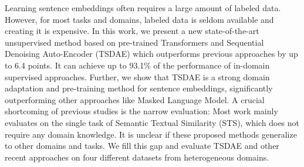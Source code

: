 Learning sentence embeddings often requires a large amount of labeled data. However, for most tasks and domains, labeled data is seldom available and creating it is expensive. In this work, we present a new state-of-the-art unsupervised method based on pre-trained Transformers and Sequential Denoising Auto-Encoder (TSDAE) which outperforms previous approaches by up to 6.4 points. It can achieve up to 93.1\% of the performance of in-domain supervised approaches. Further, we show that TSDAE is a strong domain adaptation and pre-training method for sentence embeddings, significantly outperforming other approaches like Masked Language Model. A crucial shortcoming of previous studies is the narrow evaluation: Most work mainly evaluates on the single task of Semantic Textual Similarity (STS), which does not require any domain knowledge. It is unclear if these proposed methods generalize to other domains and tasks. We fill this gap and evaluate TSDAE and other recent approaches on four different datasets from heterogeneous domains.
